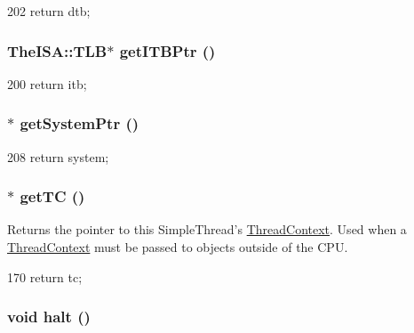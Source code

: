 \begin{DoxyCode}
202 { return dtb; }
\end{DoxyCode}
\hypertarget{classSimpleThread_a95b7e95d0558cd03d69613142fff9137}{
\subsubsection[{getITBPtr}]{\setlength{\rightskip}{0pt plus 5cm}TheISA::TLB$\ast$ getITBPtr ()}}
\label{classSimpleThread_a95b7e95d0558cd03d69613142fff9137}



\begin{DoxyCode}
200 { return itb; }
\end{DoxyCode}
\hypertarget{classSimpleThread_af7bdb56e0088b380302741ad9008f321}{
\subsubsection[{getSystemPtr}]{$\ast$ getSystemPtr ()}}
\label{classSimpleThread_af7bdb56e0088b380302741ad9008f321}



\begin{DoxyCode}
208 { return system; }
\end{DoxyCode}
\hypertarget{classSimpleThread_a81894d15db5190d5364449a4915b76f5}{
\subsubsection[{getTC}]{$\ast$ getTC ()}}
\label{classSimpleThread_a81894d15db5190d5364449a4915b76f5}
Returns the pointer to this SimpleThread's \hyperlink{classThreadContext}{ThreadContext}. Used when a \hyperlink{classThreadContext}{ThreadContext} must be passed to objects outside of the CPU. 


\begin{DoxyCode}
170 { return tc; }
\end{DoxyCode}
\hypertarget{classSimpleThread_ade0430439247877006d7df950f94918a}{
\subsubsection[{halt}]{\setlength{\rightskip}{0pt plus 5cm}void halt ()}}
\label{classSimpleThread_ade0430439247877006d7df950f94918a}


